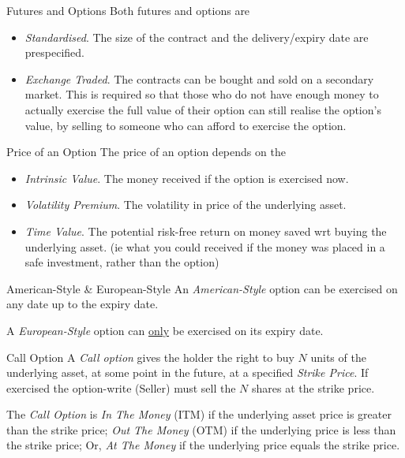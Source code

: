 \documentclass[11pt,a4paper]{article}
\begin{document}
\begin{remark}{Futures and Options}
  Both futures and options are
  \begin{itemize}
    \item \textit{Standardised}. The size of the contract and the delivery/expiry date are prespecified.
    \item \textit{Exchange Traded}. The contracts can be bought and sold on a secondary market. This is required so that those who do not have enough money to actually exercise the full value of their option can still realise the option's value, by selling to someone who can afford to exercise the option.
  \end{itemize}
\end{remark}

\begin{remark}{Price of an Option}
  The price of an option depends on the
  \begin{itemize}
    \item \textit{Intrinsic Value}. The money received if the option is exercised now.
    \item \textit{Volatility Premium}. The volatility in price of the underlying asset.
    \item \textit{Time Value}. The potential risk-free return on money saved wrt buying the underlying asset. (ie what you could received if the money was placed in a safe investment, rather than the option)
  \end{itemize}
\end{remark}

\begin{definition}{American-Style \& European-Style}
  An \textit{American-Style} option can be exercised on any date up to the expiry date.
  \par A \textit{European-Style} option can \underline{only} be exercised on its expiry date.
\end{definition}

\begin{definition}{Call Option}
  A \textit{Call option} gives the holder the right to buy $N$ units of the underlying asset, at some point in the future, at a specified \textit{Strike Price}. If exercised the option-write (Seller) must sell the $N$ shares at the strike price.
  \par The \textit{Call Option} is \textit{In The Money} (ITM) if the underlying asset price is greater than the strike price; \textit{Out The Money} (OTM) if the underlying price is less than the strike price; Or, \textit{At The Money} if the underlying price equals the strike price.
\end{definition}
\end{document}
